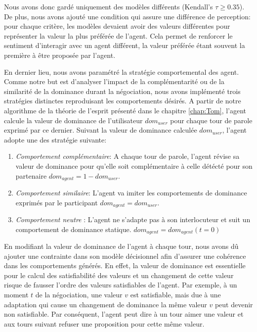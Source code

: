 Nous avons donc gardé uniquement des modèles différents (Kendall's  $ \tau \geq 0.35$). De plus, nous avons ajouté une condition qui assure une différence de perception: pour chaque critère, les modèles devaient avoir des valeurs différentes pour représenter la valeur la plus préférée de l'agent. 
Cela permet de renforcer le sentiment d'interagir avec un agent différent, la valeur préférée étant souvent la première à être proposée par l'agent. 

En dernier lieu, nous avons paramétré la stratégie comportemental des agent. Comme notre but est d'analyser l'impact de la complémentarité ou de la similarité de la dominance durant la négociation, nous avons implémenté trois stratégies distinctes reproduisant les comportements désirés. 
A partir de notre algorithme de la théorie de l'esprit présenté dans le chapitre \ref{chap:Tom}, l'agent calcule la valeur de dominance de l'utilisateur $dom_{user}$ pour chaque tour de parole exprimé par ce dernier. Suivant la valeur de dominance calculée $dom_{user}$, l'agent adopte une des stratégie suivante:



\begin{enumerate}
	\item \textit{Comportement complémentaire}: A chaque tour de parole, l'agent révise sa valeur de dominance pour qu'elle soit complémentaire à celle détécté pour son partenaire $dom_{agent}=1-dom_{user}$.
	
	\item \textit{Comportement similaire}: L'agent va imiter les comportements de dominance exprimés par le participant $dom_{agent} = dom_{user}$.
	
	\item \textit{Comportement neutre} : L'agent ne s'adapte pas à son interlocuteur et suit un comportement de dominance statique. $dom_{agent} = dom_{agent} (t=0)$
\end{enumerate}

En modifiant la valeur de dominance de l'agent à chaque tour, nous avons dû ajouter une contrainte dans son modèle décisionnel afin d'assurer une cohérence dans les comportements générés. 
En effet, la valeur de dominance est essentielle pour le calcul des satisfiabilité des valeurs et un changement de cette valeur risque de fausser l'ordre des valeurs satisfiables de l'agent.
Par exemple, à un moment $t$ de la négociation, une valeur $v$ est satisfiable, mais due à une adaptation qui cause un changement de dominance la même valeur $v$ peut devenir non satisfiable. Par conséquent, l'agent peut dire à un tour aimer une valeur et aux tours suivant refuser une proposition pour cette même valeur.

